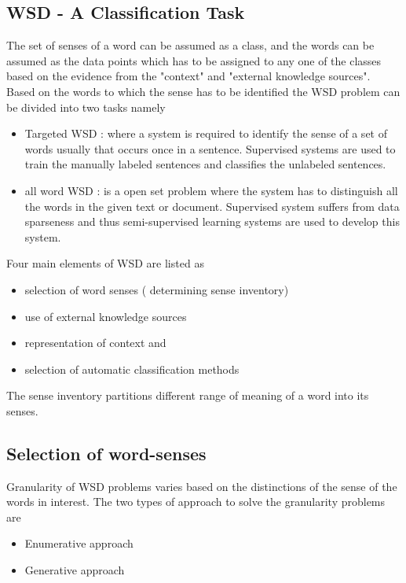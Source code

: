 \documentclass{bmcart}
\begin{document}
\subsection{WSD - A Classification Task}
\label{ssec:wsd_a_classifier}
The set of senses of a word can be assumed as a class, and the words can be assumed as the data points which has to be assigned to any one of the classes based on the evidence from the "context" and "external knowledge sources". Based on the words to which the sense has to be identified the WSD problem can be divided into two tasks namely
\begin{itemize}
\item Targeted WSD : where a system is required to identify the sense of a set of words usually that occurs once in a sentence. Supervised systems are used to train the manually labeled sentences and classifies the unlabeled sentences.
\item all word WSD : is a open set problem where the system has to distinguish all the words in the given text or document. Supervised system suffers from data sparseness and thus semi-supervised learning systems are used to develop this system.
\end{itemize}

Four main elements of WSD are listed as
\begin{itemize}
\item selection of word senses ( determining sense inventory)
\item use of external knowledge sources
\item representation of context and
\item selection of automatic classification methods
\end{itemize}
The sense inventory partitions different range of meaning of a word into its senses.

\subsection{Selection of word-senses}
\label{ssec:wordSense_selection}

Granularity of WSD problems varies based on the distinctions of the sense of the words in interest. The two types of approach to solve the granularity problems are
\begin{itemize}
\item Enumerative approach
\item Generative approach
\end{itemize}
\end{document}
